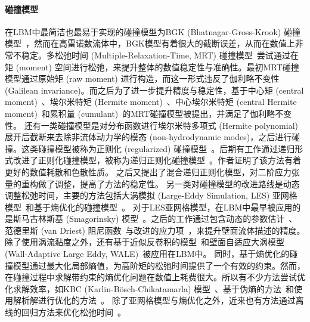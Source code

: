 \paragraph{碰撞模型}
在LBM中最简洁也最易于实现的碰撞模型为BGK (Bhatnagar-Gross-Krook) 碰撞模型~\citep{Chen-1998, Bhatnagar-1954}，然而在高雷诺数流体中，BGK模型有着很大的截断误差，从而在数值上非常不稳定。多松弛时间 (Multiple-Relaxation-Time, MRT) 碰撞模型~\citep{Coveney-2002, Lallemand-2000, dHumieres-1992}尝试通过在矩 (moment) 空间进行松弛，来提升整体的数值稳定性与准确性。最初MRT碰撞模型通过原始矩 (raw moment) 进行构造，而这一形式违反了伽利略不变性 (Galilean invariance)。而之后为了进一步提升精度与稳定性，基于中心矩 (central moment)~\citep{Geier-2006, Geier-2009}、埃尔米特矩 (Hermite moment)~\citep{Shan-2007, Chen-2014, Adhikari-2008}、中心埃尔米特矩 (central Hermite moment)~\citep{Mattila-2017, Shan-2019}和累积量 (cumulant)~\citep{Geier-2015, Geier-2017}的MRT碰撞模型被提出，并满足了伽利略不变性。
还有一类碰撞模型是对分布函数进行埃尔米特多项式 (Hermite polynomial) 展开后截断来去除非流体动力学的模态 (non-hydrodynamic modes)，之后进行碰撞。这类碰撞模型被称为正则化 (regularized) 碰撞模型~\citep{Zhang-2006, Latt-2006}。后期有工作通过递归形式改进了正则化碰撞模型，被称为递归正则化碰撞模型~\citep{Malaspinas-2015, Coreixas-2017}。作者证明了该方法有着更好的数值耗散和色散性质。\citet{Jacob-2018} 之后又提出了混合递归正则化模型，对二阶应力张量的重构做了调整，提高了方法的稳定性。
另一类对碰撞模型的改进路线是动态调整松弛时间，主要的方法包括大涡模拟 (Large-Eddy Simulation, LES) 亚网格模型~\citep{Eggels-1996, Sagaut-2010}和基于熵优化的碰撞模型~\citep{Karlin-1999, Ansumali-2003}。
对于LES亚网格模型，在LBM中最早被应用的是斯马古林斯基 (Smagorinsky) 模型~\citep{Hou-1994, Krafczyk-2003}。之后的工作通过包含动态的参数估计~\citep{Premnath-2009}、范德里斯 (van Driest) 阻尼函数~\citep{Malaspinas-2014}与改进的应力项~\citep{Leveque-2007}，来提升壁面流体描述的精度。
除了使用涡流黏度之外，还有基于近似反卷积的模型~\citep{Malaspinas-2011, Nathen-2018}和壁面自适应大涡模型 (Wall-Adaptive Large Eddy, WALE)~\citep{Weickert-2010}被应用在LBM中。
同时，基于熵优化的碰撞模型通过最大化局部熵值，为高阶矩的松弛时间提供了一个有效的约束。然而，在碰撞过程中求解带约束的熵优化问题在数值上耗费很大。所以有不少方法尝试优化求解效率，如KBC (Karlin-B\"osch-Chikatamarla) 模型~\citep{Karlin-2014}、基于伪熵的方法~\citep{Kramer-2019}和使用解析解进行优化的方法~\citep{Tang-2022}。
除了亚网格模型与熵优化之外，近来也有方法通过离线的回归方法来优化松弛时间~\citep{Li-2020}。


